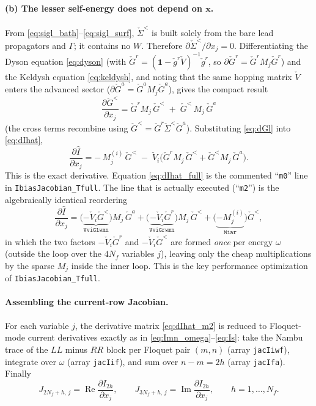 \documentclass[11pt,a4paper]{article}
\newcommand{\id}{\mathbf{1}}          %
\newcommand{\Real}{\operatorname{Re}}
\newcommand{\Imag}{\operatorname{Im}}
\newcommand{\Wm}{W}
\begin{document}
\paragraph{(b) The lesser self-energy does not depend on $\mathbf x$.}
From \eqref{eq:sigl_bath}--\eqref{eq:sigl_surf}, $\check\Sigma^<$ is built solely
from the bare lead propagators and $\Gamma$; it contains no $\Wm$.  Therefore
$\partial\check\Sigma^</\partial x_j=0$.  Differentiating the Dyson equation
\eqref{eq:dyson} (with $\check G^r=(\id-\check g^r\check V)^{-1}\check g^r$,
so $\partial\check G^r=\check G^r M_j\check G^r$) and the Keldysh equation
\eqref{eq:keldysh}, and noting that the same hopping matrix $\check V$ enters the
advanced sector ($\partial\check G^a=\check G^a M_j\check G^a$), gives the compact
result
\begin{equation}
  \boxed{\;
  \frac{\partial \check G^<}{\partial x_j}
  = \check G^r M_j\,\check G^< \;+\; \check G^<\,M_j\,\check G^a \;}
  \label{eq:dGl}
\end{equation}
(the cross terms recombine using $\check G^<=\check G^r\check\Sigma^<\check G^a$).
Substituting \eqref{eq:dGl} into \eqref{eq:dIhat},
\begin{equation}
  \frac{\partial \hat I}{\partial x_j}
  = -\,M^{(i)}_j\,\check G^<
    \;-\;\check V_i\Big(\check G^r M_j\,\check G^< + \check G^<M_j\,\check G^a\Big).
  \label{eq:dIhat_full}
\end{equation}
This is the exact derivative.  Equation \eqref{eq:dIhat_full} is the commented
``\texttt{m0}'' line in \texttt{IbiasJacobian\_Tfull}.  The line that is actually executed
(``\texttt{m2}'') is the algebraically identical reordering
\begin{equation}
  \frac{\partial \hat I}{\partial x_j}
  = \big(\underbrace{-\check V_i\check G^<}_{\texttt{VviGlwmn}}\big)M_j\,\check G^a
   +\big(\underbrace{-\check V_i\check G^r}_{\texttt{VviGrwmn}}\big)M_j\,\check G^<
   +\big(\underbrace{-M^{(i)}_j}_{\texttt{Miar}}\big)\check G^<,
  \label{eq:dIhat_m2}
\end{equation}
in which the two factors $-\check V_i\check G^r$ and $-\check V_i\check G^<$ are
formed \emph{once} per energy $\omega$ (outside the loop over the $4N_f$
variables $j$), leaving only the cheap multiplications by the sparse $M_j$ inside
the inner loop.  This is the key performance optimization of \texttt{IbiasJacobian\_Tfull}.

\paragraph{Assembling the current-row Jacobian.}
For each variable $j$, the derivative matrix \eqref{eq:dIhat_m2} is reduced to
Floquet-mode current derivatives exactly as in
\eqref{eq:Imn_omega}--\eqref{eq:Is}: take the Nambu trace of the $LL$ minus $RR$
block per Floquet pair $(m,n)$ (array \texttt{jacIiwf}), integrate over $\omega$
(array \texttt{jacIif}), and sum over $n-m=2h$ (array \texttt{jacIfa}).  Finally
\begin{equation}
  J_{2N_f+h,\,j} = \Real\frac{\partial I_{2h}}{\partial x_j},
  \qquad
  J_{3N_f+h,\,j} = \Imag\frac{\partial I_{2h}}{\partial x_j},
  \qquad h=1,\dots,N_f.
  \label{eq:jac_current}
\end{equation}
\end{document}
